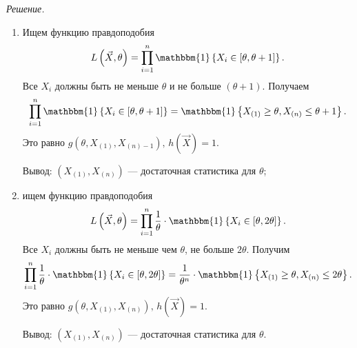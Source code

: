 \textit{Решение.}
\begin{enumerate}[label=\alph*)]
  \item Ищем функцию правдоподобия
  $$L \left( \vec{X}, \theta \right) =
    \prod \limits_{i = 1}^n
      \mathbbm{1} \left\{ X_i \in \left[ \theta, \theta + 1 \right] \right\}.$$
  Все $X_i$ должны быть не меньше $ \theta $ и не больше $ \left( \theta + 1 \right) $.
  Получаем
  $$ \prod \limits_{i = 1}^n
      \mathbbm{1} \left\{ X_i \in \left[ \theta, \theta + 1 \right] \right\} =
    \mathbbm{1} \left\{
      X_{ \left( 1 \right) } \geq \theta, X_{ \left( n \right) } \leq \theta + 1
    \right\}.$$
  Это равно $g \left( \theta, X_{ \left( 1 \right) }, X_{ \left( n \right) - 1 } \right), \,
    h \left( \vec{X} \right) = 1.$

  Вывод: $ \left( X_{ \left( 1 \right) }, X_{ \left( n \right) } \right) $ ---
  достаточная статистика для $ \theta $;
  \item ищем функцию правдоподобия
  $$L \left( \vec{X}, \theta \right) =
    \prod \limits_{i = 1}^n
      \frac{1}{ \theta } \cdot
      \mathbbm{1} \left\{ X_i \in \left[ \theta, 2 \theta \right] \right\}.$$
  Все $X_i$ должны быть не меньше чем $ \theta $, не больше $2 \theta $.
  Получим
  $$ \prod \limits_{i = 1}^n
      \frac{1}{ \theta } \cdot
      \mathbbm{1} \left\{ X_i \in \left[ \theta, 2 \theta \right] \right\} =
    \frac{1}{ \theta^n} \cdot
    \mathbbm{1} \left\{
      X_{ \left( 1 \right) } \geq \theta, X_{ \left( n \right) } \leq 2 \theta
    \right\}.$$
  Это равно $g \left( \theta, X_{ \left( 1 \right) }, X_{ \left( n \right) } \right), \,
    h \left( \vec{X} \right) = 1.$

  Вывод: $ \left( X_{ \left( 1 \right) }, X_{ \left( n \right) } \right) $ ---
  достаточная статистика для $ \theta $.
\end{enumerate}
